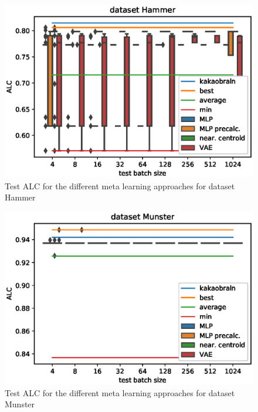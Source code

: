 \documentclass{article}
\begin{document}
\begin{figure}[H]
\begin{center}
 	\includegraphics[width=0.99\linewidth]{../figures/16.eps} 
\end{center}
\caption{Test ALC for the different meta learning approaches for dataset Hammer}
\label{fig:16}
\end{figure} 
%
\begin{figure}[H]
\begin{center}
 	\includegraphics[width=0.99\linewidth]{../figures/13.eps} 
\end{center}
\caption{Test ALC for the different meta learning approaches for dataset Munster}
\label{fig:13}
\end{figure} 
%
\end{document}
